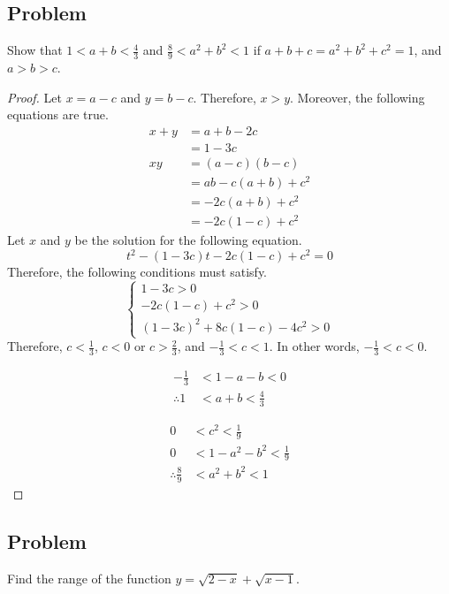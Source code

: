 \documentclass{article}
\begin{document}
\newpage
\subsection*{Problem}
Show that $1 < a + b < \frac{4}{3}$ and
$\frac{8}{9} < a^2 + b^2 < 1$ if
$a + b + c = a^2 + b^2 + c^2 = 1$, and $a > b > c$.
\begin{proof}
Let $x = a - c$ and $y = b - c$. Therefore, $x > y$.
Moreover, the following equations are true.
\begin{align*}
    x + y
    &= a + b - 2c \\
    &= 1 - 3c \\
    xy
    &= (a - c)(b - c) \\
    &= ab - c(a + b) + c^2 \\
    &= -2c(a + b) + c^2 \\
    &= -2c(1 - c) + c^2
\end{align*}
Let $x$ and $y$ be the solution for the following equation.
\[
t^2 - (1 - 3c)t - 2c(1 - c) + c^2 = 0
\]
Therefore, the following conditions must satisfy.
\[
\begin{cases}
    1 - 3c > 0 \\
    - 2c(1 - c) + c^2 > 0 \\
    (1 - 3c)^2 + 8c(1 - c) - 4c^2 > 0
\end{cases}
\]
Therefore, $c < \frac{1}{3}$, $c < 0$ or $c > \frac{2}{3}$,
and $-\frac{1}{3} < c < 1$. In other words,
$-\frac{1}{3} < c < 0$. \\
\begin{minipage}[t]{0.48\textwidth}
\begin{align*}
    -\frac{1}{3} &< 1 - a - b < 0 \\
    \therefore 1 &< a + b < \frac{4}{3}
\end{align*}
\end{minipage}
\hfill
\begin{minipage}[t]{0.48\textwidth}
\begin{align*}
    0 &< c^2 < \frac{1}{9} \\
    0 &< 1 - a^2 - b^2 < \frac{1}{9} \\
    \therefore \frac{8}{9} &< a^2 + b^2 < 1
\end{align*}
\end{minipage}
\end{proof}

\subsection*{Problem}
Find the range of the function
$y = \sqrt{2 - x} + \sqrt{x - 1}$.
\end{document}
